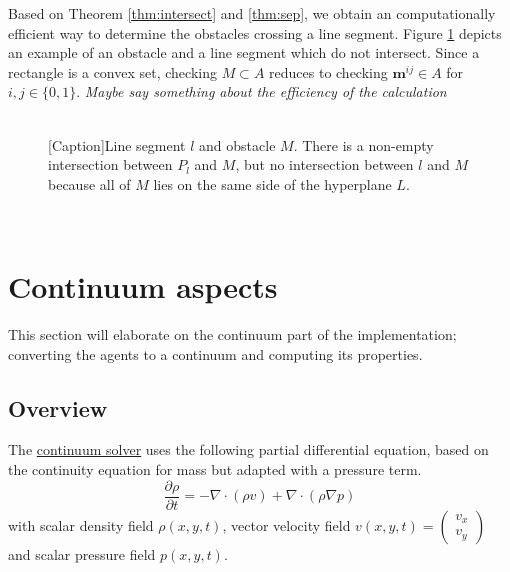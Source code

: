 \documentclass{article}
\renewcommand{\vec}[1]{\mathbf{#1}}
\begin{document}
\newpage
\noindent
Based on Theorem \ref{thm:intersect} and \ref{thm:sep}, we obtain an computationally efficient way to determine the obstacles crossing a line segment.
Figure \ref{fig:crosses_obstacle} depicts an example of an obstacle and a line segment which do not intersect.
Since a rectangle is a convex set, checking $M \subset A$ reduces to checking $\vec{m}^{ij} \in A$ for $i,j \in \{0,1\}$.
\emph{Maybe say something about the efficiency of the calculation}
\\ \
\begin{figure}[ht]
	\centering
	[Caption]{Line segment $l$ and obstacle $M$. There is a non-empty intersection between $P_l$ and $M$, but no intersection between $l$ and $M$ because all of $M$ lies on the same side of the hyperplane $L$.}
	\label{fig:crosses_obstacle}
\end{figure}\\
\newpage
\section{Continuum aspects}
\label{sec:continuum}
This section will elaborate on the continuum part of the implementation; converting the agents to a continuum and computing its properties.
\subsection{Overview}
The \underline{continuum solver} uses the following partial differential equation, based on the continuity equation for mass but adapted with a pressure term.
\begin{equation}\label{eq:pde}
\frac{\partial \rho}{\partial t} =-\nabla \cdot(\rho{v}) + \nabla \cdot (\rho\nabla p)
\end{equation}
with scalar density field $\rho(x,y,t)$, vector velocity field $v(x,y,t) = \begin{pmatrix}v_x\\v_y\end{pmatrix}$ and scalar pressure field $p(x,y,t)$.
\end{document}
